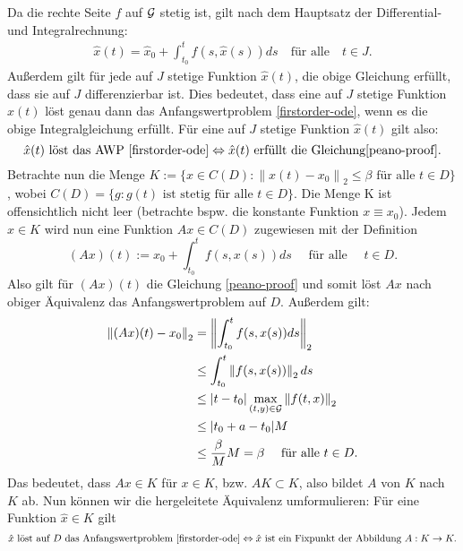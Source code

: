 Da die rechte Seite $f$ auf ${\cal G}$ stetig ist, gilt nach dem Hauptsatz der Differential- und Integralrechnung:
\begin{align}
    \hat{x}(t) = \hat{x}_0 + \int_{t_0}^{t} f(s, \hat{x}(s)) ds \quad \text{für alle} \quad t \in J.
    \label{peano-proof}
\end{align}
Außerdem gilt für jede auf $J$ stetige Funktion $\hat{x}(t)$, die obige Gleichung erfüllt, dass sie auf $J$
differenzierbar ist. Dies bedeutet, dass eine auf $J$ stetige Funktion $\hat{x}(t)$ löst genau dann das
Anfangswertproblem \eqref{firstorder-ode}, wenn es die obige Integralgleichung erfüllt. Für eine auf $J$ stetige
Funktion $\hat{x}(t)$ gilt also:
\[
    \hat{x}(t) \text{ löst das AWP \eqref{firstorder-ode}}  \Leftrightarrow \hat{x}(t)
    \text{ erfüllt die Gleichung} \eqref{peano-proof}.
\]
Betrachte nun die Menge $K := \{ x \in C(D): \left\lVert x(t) - x_0 \right\rVert_2 \leq \beta \text{ für alle }
t \in D \}$, wobei $C(D)=\{g: g(t) \text{ ist stetig für alle } t \in D \}$. Die Menge K ist offensichtlich nicht leer
(betrachte bspw. die konstante Funktion $x \equiv x_0$). Jedem $x \in K$ wird nun eine Funktion $Ax \in C(D)$ zugewiesen
mit der Definition
\[
    (Ax)(t) := x_0 + \int_{t_0}^{t} f(s, x(s)) ds \quad \text{ für alle } \quad t \in D.
\]
Also gilt für $(Ax)(t)$ die Gleichung \eqref{peano-proof} und somit löst $Ax$ nach obiger Äquivalenz das
Anfangswertproblem auf $D$. Außerdem gilt:
\begin{align*}
    \left\lVert (Ax)(t) - x_0 \right\rVert_2 &= \left\lVert \int_{t_0}^{t} f(s, x(s)) ds \right\rVert_2 \\
    &\leq \int_{t_0}^{t} \left\lVert f(s, x(s)) \right\rVert_2 ds \\
    &\leq |t - t_0| \max_{(t,y)\in {\cal G}}\left\lVert f(t,x)\right\rVert_2 \\
    &\leq |t_0 + a - t_0| M \\
    &\leq \frac{\beta}{M}M = \beta \quad \text{ für alle } t \in D.
\end{align*}
Das bedeutet, dass $Ax \in K$ für $x \in K$, bzw. $AK \subset K$, also bildet $A$ von $K$ nach $K$ ab. Nun können wir die
hergeleitete Äquivalenz umformulieren: Für eine Funktion $\hat{x} \in K$ gilt
\[
    \hat{x} \text{ löst auf $D$ das Anfangswertproblem } \eqref{firstorder-ode} \Leftrightarrow \hat{x}
    \text{ ist ein Fixpunkt der Abbildung } A:K \rightarrow K.
\]
